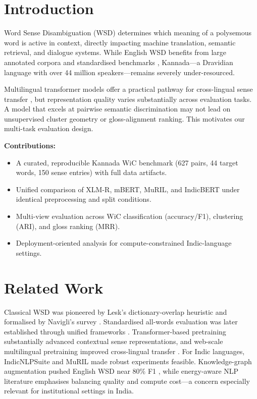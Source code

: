 \documentclass[conference]{IEEEtran}
\begin{document}
\section{Introduction}

Word Sense Disambiguation (WSD) determines which meaning of a polysemous word
is active in context, directly impacting machine translation, semantic retrieval,
and dialogue systems.
While English WSD benefits from large annotated corpora and standardised
benchmarks \cite{raganato2017}, Kannada---a Dravidian language with over
44 million speakers---remains severely under-resourced.

Multilingual transformer models offer a practical pathway for cross-lingual
sense transfer \cite{devlin2019,conneau2020}, but representation quality varies
substantially across evaluation tasks.
A model that excels at pairwise semantic discrimination may not lead on
unsupervised cluster geometry or gloss-alignment ranking.
This motivates our multi-task evaluation design.

\medskip\noindent\textbf{Contributions:}
\begin{itemize}
  \item A curated, reproducible Kannada WiC benchmark (627 pairs, 44 target words,
        150 sense entries) with full data artifacts.
  \item Unified comparison of XLM-R, mBERT, MuRIL, and IndicBERT under identical
        preprocessing and split conditions.
  \item Multi-view evaluation across WiC classification (accuracy/F1), clustering
        (ARI), and gloss ranking (MRR).
  \item Deployment-oriented analysis for compute-constrained Indic-language
        settings.
\end{itemize}

\section{Related Work}

Classical WSD was pioneered by Lesk's dictionary-overlap heuristic \cite{lesk1986}
and formalised by Navigli's survey \cite{navigli2009}.
Standardised all-words evaluation was later established through unified frameworks
\cite{raganato2017}.
Transformer-based pretraining \cite{devlin2019} substantially advanced contextual
sense representations, and web-scale multilingual pretraining improved cross-lingual
transfer \cite{conneau2020}.
For Indic languages, IndicNLPSuite \cite{kakwani2020} and MuRIL \cite{khanuja2021}
made robust experiments feasible.
Knowledge-graph augmentation pushed English WSD near 80\% F1 \cite{bevilacqua2020},
while energy-aware NLP literature \cite{strubell2019,schwartz2020} emphasises
balancing quality and compute cost---a concern especially relevant for institutional
settings in India.
\end{document}
